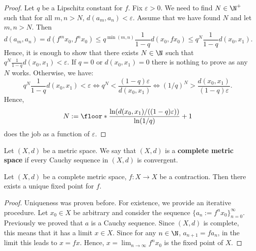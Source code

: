 \begin{proof}
  Let $q$ be a Lipschitz constant for $f$.
  Fix $\varepsilon > 0$.
  We need to find $N \in \N^+$ such that
  for all $m, n > N$, $d(a_m, a_n) < \varepsilon$.
  Assume that we have found $N$ and let $m, n > N$.
  Then
  \begin{equation}
    d(a_m, a_n)
    = d(f^m x_0, f^n x_0)
    \leq q^{\min(m, n)} \frac{1}{1 - q} d(x_0, f x_0)
    \leq q^N \frac{1}{1 - q} d(x_0, x_1).
  \end{equation}
  Hence, it is enough to show that there exists $N \in \N$ such that
  $q^N \frac{1}{1 - q} d(x_0, x_1) < \varepsilon$.
  If $q = 0$ or $d(x_0, x_1) = 0$ there is nothing to prove as any $N$ works.
  Otherwise, we have:
  \begin{equation}
    q^N \frac{1}{1 - q} d(x_0, x_1) < \varepsilon
    \Leftrightarrow q^N < \frac{(1 - q) \varepsilon}{d(x_0, x_1)}
    \Leftrightarrow (1 / q)^N > \frac{d(x_0, x_1)}{(1 - q) \varepsilon}.
  \end{equation}
  Hence,
  \begin{equation}
    N
    := \floor*{\frac{\ln(d(x_0, x_1) / ((1 - q) \varepsilon))}{\ln(1 / q)}} + 1
  \end{equation}
  does the job as a function of $\varepsilon$.
\end{proof}
\begin{definition}
  Let $(X, d)$ be a metric space.
  We say that $(X, d)$ is a \textbf{complete metric space}
  if every Cauchy sequence in $(X, d)$ is convergent.
\end{definition}
\begin{theorem}
  Let
    $(X, d)$ be a complete metric space,
    $f \colon X \to X$ be a contraction.
  Then there exists a unique fixed point for $f$.
\end{theorem}
\begin{proof}
  Uniqueness was proven before.
  For existence, we provide an iterative procedure.
  Let $x_0 \in X$ be arbitrary and consider the sequence
  $\{a_n := f^n x_0\}_{n = 0}^\infty$.
  Previously we proved that $a$ is a Cauchy sequence.
  Since $(X, d)$ is complete, this means that it has a limit $x \in X$.
  Since for any $n \in \N$, $a_{n + 1} = f a_n$, in the limit this leads to
  $x = f x$.
  Hence, $x = \lim_{n \to \infty} f^n x_0$ is the fixed point of $X$.
\end{proof}
